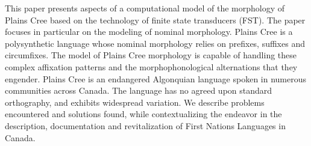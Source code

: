 This paper presents aspects of a computational model of the morphology of Plains Cree based on the technology of finite state transducers (FST). The paper focuses in particular on the modeling of nominal morphology. Plains Cree is a polysynthetic language whose nominal morphology relies on prefixes, suffixes and circumfixes. The model of Plains Cree morphology is capable of handling these complex affixation patterns and the morphophonological alternations that they engender. Plains Cree is an endangered Algonquian language spoken in numerous communities across Canada. The language has no agreed upon standard orthography, and exhibits widespread variation. We describe problems encountered and solutions found, while contextualizing the endeavor in the description, documentation and revitalization of First Nations Languages in Canada.
